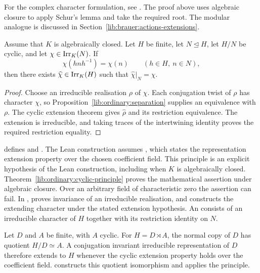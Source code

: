 For the complex character formulation, see
\cite[Corollary~11.22]{Isaacs1976}. The proof above uses
algebraic closure to apply Schur's lemma and take the required root.
The modular analogue is discussed in
Section~\ref{lib:brauer:actions-extensions}.

\begin{proposition}
\label{lib:ordinary:cyclic-bridge}
Assume that $K$ is algebraically closed. Let $H$ be finite, let
$N\trianglelefteq H$, let $H/N$ be cyclic, and let $\chi\in\operatorname{Irr}_K(N)$. If
\[
 \chi(hnh^{-1})=\chi(n)\qquad(h\in H,\ n\in N),
\]
then there exists $\widehat\chi\in\operatorname{Irr}_K(H)$ such that
$\widehat\chi|_N=\chi$.
\end{proposition}
\begin{proof}
Choose an irreducible realisation $\rho$ of $\chi$. Each conjugation twist
of $\rho$ has character $\chi$, so
Proposition~\ref{lib:ordinary:separation} supplies an equivalence with
$\rho$. The cyclic extension theorem gives $\widehat\rho$ and its
restriction equivalence. The extension is irreducible, and taking traces
of the intertwining identity proves the required restriction equality.
\end{proof}

\begin{implementation}
 defines
 and
.
The Lean construction assumes
, which states the
representation extension property over the chosen coefficient field.
This principle is an explicit hypothesis of the Lean construction,
including when $K$ is algebraically closed. Theorem~\ref{lib:ordinary:cyclic-principle}
proves the mathematical assertion under algebraic closure.
Over an arbitrary field of characteristic zero the assertion can fail. In
,
proves invariance of an irreducible realisation, and
constructs the extending character under the stated extension hypothesis.
An  consists of
an irreducible character of $H$ together with its restriction identity
on $N$.
\end{implementation}

\begin{example}
Let $D$ and $A$ be finite, with $A$ cyclic. For $H=D\rtimes A$, the normal
copy of $D$ has quotient $H/D\simeq A$. A conjugation invariant irreducible
representation of $D$ therefore extends to $H$ whenever the cyclic
extension property holds over the coefficient field.
constructs this quotient isomorphism and applies the principle.
\end{example}
